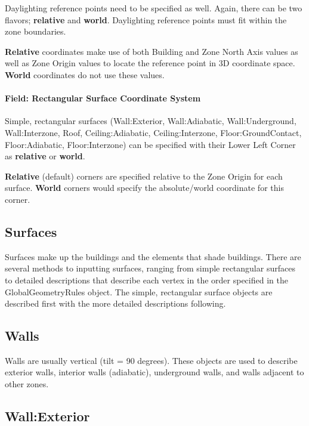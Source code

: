 Daylighting reference points need to be specified as well. Again, there can be two flavors; \textbf{relative} and \textbf{world}. Daylighting reference points must fit within the zone boundaries.

\textbf{Relative} coordinates make use of both Building and Zone North Axis values as well as Zone Origin values to locate the reference point in 3D coordinate space. \textbf{World} coordinates do not use these values.

\paragraph{Field: Rectangular Surface Coordinate System}\label{field-rectangular-surface-coordinate-system}

Simple, rectangular surfaces (Wall:Exterior, Wall:Adiabatic, Wall:Underground, Wall:Interzone, Roof, Ceiling:Adiabatic, Ceiling:Interzone, Floor:GroundContact, Floor:Adiabatic, Floor:Interzone) can be specified with their Lower Left Corner as \textbf{relative} or \textbf{world}.

\textbf{Relative} (default) corners are specified relative to the Zone Origin for each surface. \textbf{World} corners would specify the absolute/world coordinate for this corner.

\subsection{Surfaces}\label{surfaces-1}

Surfaces make up the buildings and the elements that shade buildings. There are several methods to inputting surfaces, ranging from simple rectangular surfaces to detailed descriptions that describe each vertex in the order specified in the GlobalGeometryRules object. The simple, rectangular surface objects are described first with the more detailed descriptions following.

\subsection{Walls}\label{walls}

Walls are usually vertical (tilt = 90 degrees). These objects are used to describe exterior walls, interior walls (adiabatic), underground walls, and walls adjacent to other zones.

\subsection{Wall:Exterior}\label{wallexterior}

